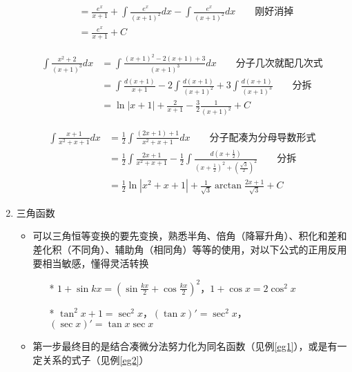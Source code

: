 \begin{enumerate}
\begin{example}
\begin{equation*}
\begin{aligned}
			&= \frac{e^x}{x+1}+\int \frac{e^x}{(x+1)^2}dx - \int \frac{e^x}{(x+1)^2}dx\qquad\mbox{刚好消掉}\\
			&= \frac{e^x}{x+1}+C
		\end{aligned}
		\end{equation*}
	\end{example}
	\begin{example}
		\label{egfrac3}
		\begin{equation*}
		\begin{aligned}
			\int\frac{x^2+2}{(x+1)^3}dx &= \int \frac{(x+1)^2-2(x+1)+3}{(x+1)^3}dx\qquad\mbox{分子几次就配几次式}\\
			&= \int \frac{d(x+1)}{x+1} - 2\int \frac{d(x+1)}{(x+1)^2} + 3\int \frac{d(x+1)}{(x+1)^3}\qquad\mbox{分拆}\\
			&= \ln|x+1|+\frac{2}{x+1}-\frac{3}{2}\frac{1}{(x+1)^2}+C
		\end{aligned}
		\end{equation*}
	\end{example}
	\begin{example}
		\label{egfrac4}
		\begin{equation*}
		\begin{aligned}
			\int\frac{x+1}{x^2+x+1}dx &= \frac{1}{2}\int \frac{(2x+1)+1}{x^2+x+1}dx\qquad\mbox{分子配凑为分母导数形式}\\
			&= \frac{1}{2}\int \frac{2x+1}{x^2+x+1} - \frac{1}{2}\int \frac{d(x+\frac{1}{2})}{(x+\frac{1}{2})^2+(\frac{\sqrt{3}}{2})^2}\qquad\mbox{分拆}\\
			&= \frac{1}{2}\ln|x^2+x+1|+\frac{1}{\sqrt{3}}\arctan\frac{2x+1}{\sqrt{3}}+C
		\end{aligned}
		\end{equation*}
	\end{example}
	\item 三角函数
	\begin{itemize}
		\item 可以三角恒等变换的要先变换，熟悉半角、倍角（降幂升角）、积化和差和差化积（不同角）、辅助角（相同角）等等的使用，对以下公式的正用反用要相当敏感，懂得灵活转换
		\begin{itemize}
			\item[*] $\displaystyle 1+\sin kx=(\sin\frac{kx}{2}+\cos\frac{kx}{2})^2$，$1+\cos x=2\cos^2 x$
			\item[*] $\tan^2 x+1=\sec^2 x$，$(\tan x)'=\sec^2 x$，$(\sec x)'=\tan x\sec x$
		\end{itemize}
		\item 第一步最终目的是结合凑微分法努力化为同名函数（见例\ref{eg1}），或是有一定关系的式子（见例\ref{eg2}）

\end{itemize}
\end{enumerate}
